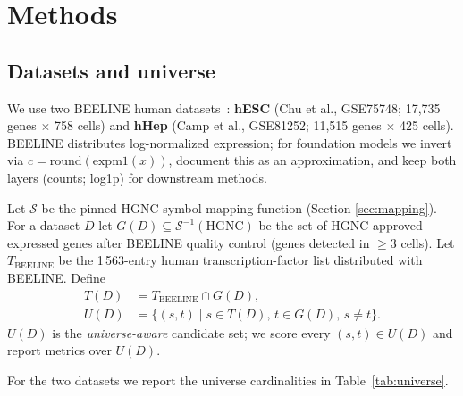 \documentclass[sigconf]{acmart}
\begin{document}
\section{Methods}
\label{sec:methods}

\subsection{Datasets and universe}
\label{sec:universe}

We use two BEELINE human datasets~\cite{pratapa2020}:
\textbf{hESC} (Chu et al., GSE75748; 17{,}735 genes $\times$ 758 cells)
and \textbf{hHep} (Camp et al., GSE81252; 11{,}515 genes $\times$ 425
cells). BEELINE distributes log-normalized expression; for foundation
models we invert via $c = \text{round}(\text{expm1}(x))$, document this
as an approximation, and keep both layers (counts; log1p) for downstream
methods.

\begin{definition}
\label{def:universe}
Let $\mathcal{S}$ be the pinned HGNC symbol-mapping function (Section
\ref{sec:mapping}). For a dataset $D$ let $G(D) \subseteq \mathcal{S}^{-1}(\text{HGNC})$ be the set of HGNC-approved expressed genes
after BEELINE quality control (genes detected in $\ge 3$ cells). Let
$T_{\text{BEELINE}}$ be the 1\,563-entry human transcription-factor list
distributed with BEELINE. Define
\begin{align*}
T(D) &= T_{\text{BEELINE}} \cap G(D),\\
U(D) &= \{ (s, t) \mid s \in T(D),\, t \in G(D),\, s \neq t \}.
\end{align*}
$U(D)$ is the \emph{universe-aware} candidate set; we score every
$(s, t) \in U(D)$ and report metrics over $U(D)$.
\end{definition}

For the two datasets we report the universe cardinalities in
Table~\ref{tab:universe}.
\end{document}
